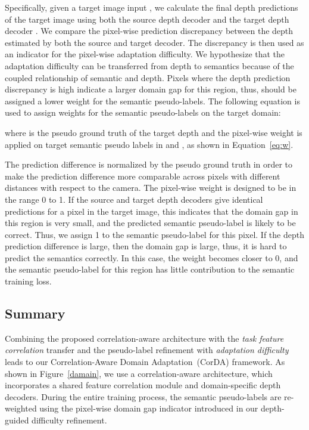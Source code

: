 \documentclass[10pt,twocolumn,letterpaper]{article}
\begin{document}
Specifically, given a target image input , we calculate the final depth predictions of the target image using both the source depth decoder  and the target depth decoder . We compare the pixel-wise prediction discrepancy between the depth estimated by both the source and target decoder. The discrepancy is then used as an indicator for the pixel-wise adaptation difficulty. We hypothesize that the adaptation difficulty can be transferred from depth to semantics because of the coupled relationship of semantic and depth. Pixels where the depth prediction discrepancy is high indicate a larger domain gap for this region, thus, should be assigned a lower weight for the semantic pseudo-labels. The following equation is used to assign weights for the semantic pseudo-labels on the target domain: 


where  is the pseudo ground truth of the target depth and the pixel-wise weight  is applied on target semantic pseudo labels in   and , as shown in Equation~\ref{eq:w}.

The prediction difference is normalized by the pseudo ground truth  in order to make the prediction difference more comparable across pixels with different distances with respect to the camera. The pixel-wise weight  is designed to be in the range 0 to 1. If the source and target depth decoders give identical predictions for a pixel in the target image, this indicates that the domain gap in this region is very small, and the predicted semantic pseudo-label is likely to be correct. Thus, we assign 1 to the semantic pseudo-label for this pixel. If the depth prediction difference is large, then the domain gap is large, thus, it is hard to predict the semantics correctly. In this case, the weight  becomes closer to 0, and the semantic pseudo-label for this region has little contribution to the semantic training loss. 

\subsection{Summary}
\label{sec:summary}
Combining the proposed correlation-aware architecture with the \textit{task feature correlation} transfer and the pseudo-label refinement with \textit{adaptation difficulty} leads to our Correlation-Aware Domain Adaptation~(CorDA) framework. As shown in Figure~\ref{damain}, we use a correlation-aware architecture, which incorporates a shared feature correlation module and domain-specific depth decoders. During the entire training process, the semantic pseudo-labels are re-weighted using the pixel-wise domain gap indicator introduced in our depth-guided difficulty refinement. 
\end{document}
